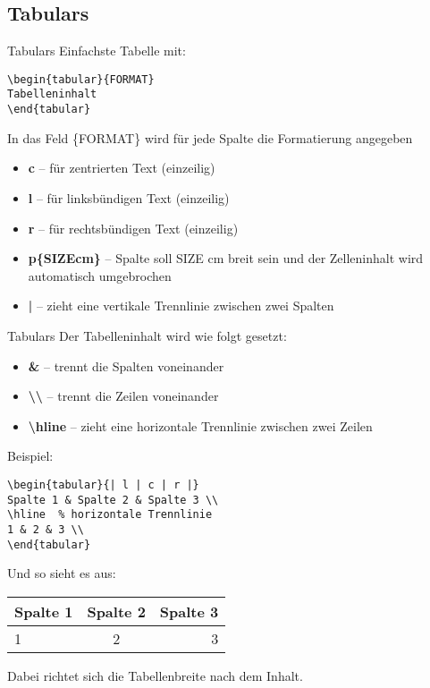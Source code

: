 \subsection{Tabulars}
\begin{frame}[fragile]{Tabulars}
Einfachste Tabelle mit:
\begin{lstlisting}[style=tex]
\begin{tabular}{FORMAT}
Tabelleninhalt
\end{tabular}\end{lstlisting}

In das Feld \{FORMAT\} wird für jede Spalte die Formatierung angegeben
\begin{itemize}
\item \textbf{c} -- für zentrierten Text (einzeilig)
\item \textbf{l} -- für linksbündigen Text (einzeilig)
\item \textbf{r} -- für rechtsbündigen Text (einzeilig)
\item \textbf{p\{SIZEcm\}} -- Spalte soll SIZE cm breit sein und der Zelleninhalt wird automatisch umgebrochen
\item \textbf{|} -- zieht eine vertikale Trennlinie zwischen zwei Spalten
\end{itemize}
\end{frame}

\begin{frame}[fragile]{Tabulars}
Der Tabelleninhalt wird wie folgt gesetzt:
\begin{itemize}
\item \textbf{\&} -- trennt die Spalten voneinander
\item \textbf{\textbackslash\textbackslash} -- trennt die Zeilen voneinander
\item \textbf{\textbackslash hline} -- zieht eine horizontale Trennlinie zwischen zwei Zeilen
\end{itemize}

Beispiel:
\begin{lstlisting}[style=tex]
\begin{tabular}{| l | c | r |}
Spalte 1 & Spalte 2 & Spalte 3 \\
\hline  % horizontale Trennlinie
1 & 2 & 3 \\
\end{tabular}
\end{lstlisting}

\bigskip
Und so sieht es aus:
\renewcommand{\arraystretch}{1.2}
\begin{tabular}{| l | c | r |}
Spalte 1 & Spalte 2 & Spalte 3 \\
\hline
1 & 2 & 3 \\
\end{tabular}

\bigskip
Dabei richtet sich die Tabellenbreite nach dem Inhalt.
\end{frame}

